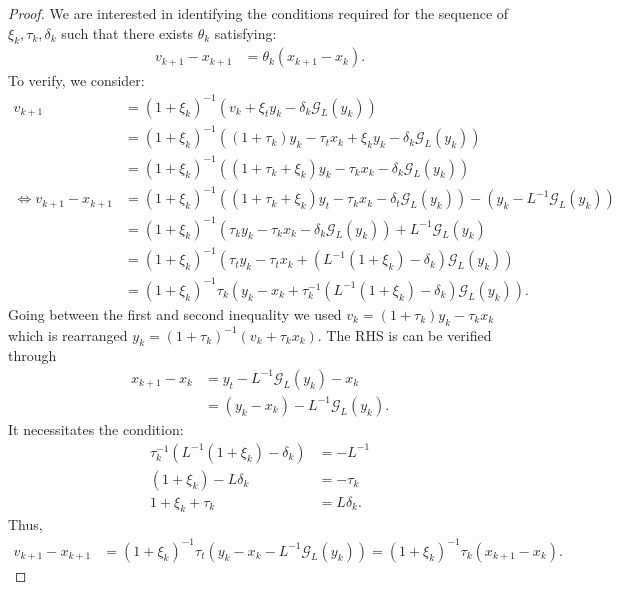 \documentclass[12pt]{article}
\begin{document}
    \begin{proof}
        We are interested in identifying the conditions required for the sequence of $\xi_k, \tau_k, \delta_k$ such that there exists $\theta_k$ satisfying:
        \begin{align*}
            v_{k + 1} - x_{k + 1}
            &= \theta_k(x_{k + 1} - x_k).
        \end{align*}
        To verify, we consider:
        \begin{align*}
            v_{k + 1} &=
            (1 + \xi_k)^{-1}(v_k + \xi_t y_k - \delta_k \mathcal G_L(y_k))
            \\
            &=
            (1 + \xi_k)^{-1}((1 + \tau_k)y_k - \tau_t x_k + \xi_k y_k - \delta_k \mathcal G_L(y_k))
            \\
            &=
            (1 + \xi_k)^{-1}((1 + \tau_k + \xi_k)y_k - \tau_k x_k - \delta_k \mathcal G_L(y_k))
            \\
            \iff
            v_{k + 1} - x_{k + 1}
            &=
            (1 + \xi_k)^{-1}((1 + \tau_k + \xi_k)y_t - \tau_k x_k - \delta_t \mathcal G_L(y_k))
            - (y_k - L^{-1}\mathcal G_L(y_k))
            \\
            &=
            (1 + \xi_k)^{-1}(\tau_ky_k - \tau_k x_k - \delta_k \mathcal G_L(y_k))
            + L^{-1}\mathcal G_L(y_k)
            \\
            &=
            (1 + \xi_k)^{-1}
            \left(
                \tau_ty_k - \tau_t x_k + (L^{-1}(1 + \xi_k) - \delta_k) \mathcal G_L(y_k)
            \right)
            \\
            &=
            (1 + \xi_k)^{-1}\tau_k
            \left(
                y_k - x_k +
                \tau_k^{-1}(L^{-1}(1 + \xi_k) - \delta_k) \mathcal G_L(y_k)
            \right).
        \end{align*}
        Going between the first and second inequality we used $v_k = (1 + \tau_k)y_k - \tau_k x_k$ which is rearranged $y_k = (1 + \tau_k)^{-1}(v_k + \tau_k x_k)$.
        The RHS is can be verified through
        \begin{align*}
            x_{k + 1} - x_k &=
            y_t - L^{-1}\mathcal G_L(y_k) - x_k
            \\
            &= (y_k - x_k) - L^{-1}\mathcal G_L(y_k).
        \end{align*}
        It necessitates the condition:
        \begin{align*}
            \tau_k^{-1}(L^{-1}(1 + \xi_k) - \delta_k)
            &= - L^{-1}
            \\
            (1 + \xi_k) - L\delta_k
            &=
            - \tau_k
            \\
            1 + \xi_k + \tau_k
            &=
            L\delta_k.
        \end{align*}
        Thus,
        \begin{align*}
            v_{k + 1} - x_{k + 1} &=
            (1 + \xi_k)^{-1}\tau_t
            \left(y_k - x_k - L^{-1}\mathcal G_L(y_k)\right)
            =
            (1 + \xi_k)^{-1}\tau_k(x_{k + 1} - x_k).
        \end{align*}
    \end{proof}
\end{document}
